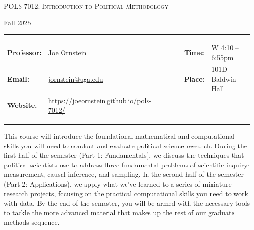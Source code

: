\documentclass[11pt, letterpaper]{article}
\begin{document}
\begin{center}
{\Large \textsc{POLS 7012: Introduction to Political Methodology}}
\end{center}
\begin{center}
{\large Fall 2025}
\end{center}

\begin{center}
\rule{6.5in}{0.4pt}
\begin{minipage}[t]{.96\textwidth}
\begin{tabular}{llcccll}
\textbf{Professor:} & Joe Ornstein & & &  & \textbf{Time:} & W 4:10 -- 6:55pm \\
\textbf{Email:} &  \href{mailto:jornstein@uga.edu}{jornstein@uga.edu} & & & & \textbf{Place:} & 101D Baldwin Hall\\
\textbf{Website:} & \href{https://joeornstein.github.io/pols-7012/}{https://joeornstein.github.io/pols-7012/} & & & & &
\end{tabular}
\end{minipage}
\rule{6.5in}{0.4pt}
\end{center}
\vspace{.15cm}
\setlength{\unitlength}{1in}
\renewcommand{\arraystretch}{2}



\noindent This course will introduce the foundational mathematical and computational skills you will need to conduct and evaluate political science research. During the first half of the semester (Part 1: Fundamentals), we discuss the techniques that political scientists use to address three fundamental problems of scientific inquiry: measurement, causal inference, and sampling. In the second half of the semester (Part 2: Applications), we apply what we've learned to a series of miniature research projects, focusing on the practical computational skills you need to work with data. By the end of the semester, you will be armed with the necessary tools to tackle the more advanced material that makes up the rest of our graduate methods sequence. %
\end{document}
